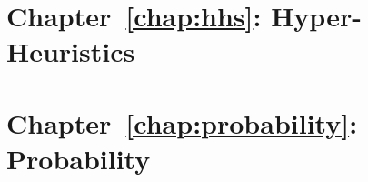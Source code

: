 \section{Chapter~\ref{chap:hhs}: Hyper-Heuristics}
\label{sec:symbols:hhs}

\begin{description}
	\item [\parbox{1cm}{$K$}]
\end{description}

\section{Chapter~\ref{chap:probability}: Probability}
\label{sec:symbols:probability}

\begin{description}
	\item [\parbox{1cm}{$\alpha_{0}$}]
	\item [\parbox{1cm}{$\alpha_{1}$}]
	\item [\parbox{1cm}{$\alpha_{k}$}]
	\item [\parbox{1cm}{$\alpha_{K}$}]
	\item [\parbox{1cm}{$\alpha$}]
	\item [\parbox{1cm}{$\bar{A}$}]
	\item [\parbox{1cm}{$\beta'$ }]
	\item [\parbox{1cm}{$\beta$}]
	\item [\parbox{1cm}{$Bin$}]
	\item [\parbox{1cm}{$\boldsymbol{\alpha'}$}]
	\item [\parbox{1cm}{$\boldsymbol{\alpha}$}]
	\item [\parbox{1cm}{$\boldsymbol{\mathcal{D}}$}]
	\item [\parbox{1cm}{$\boldsymbol{\theta}$}]
	\item [\parbox{1cm}{$\boldsymbol{N}$}]
	\item [\parbox{1cm}{$\boldsymbol{x_{1}}$}]
	\item [\parbox{1cm}{$\boldsymbol{x_{i}}$}]
	\item [\parbox{1cm}{$\boldsymbol{x_{I}}$}]
	\item [\parbox{1cm}{$\boldsymbol{x}$}]
	\item [\parbox{1cm}{$\boldsymbol{X}$}]
	\item [\parbox{1cm}{$\boldsymbol{Y}$}]
	\item [\parbox{1cm}{$\emptyset$}]
	\item [\parbox{1cm}{$\Gamma'(n)$}]
	\item [\parbox{1cm}{$\Gamma(n)$}]

\end{description}
